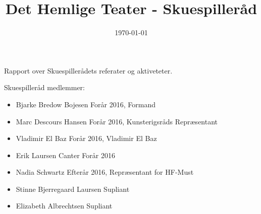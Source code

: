 \documentclass[12pt, a4paper]{article}
\title{Det Hemlige Teater - Skuespilleråd}
\date{\today}
\begin{document}
\listoftodos
\maketitle
\begin{center}
  Rapport over Skuespillerådets referater og aktiveteter.
\end{center}
\vfill
Skuespilleråd medlemmer:
\begin{itemize}
  \item Bjarke Bredow Bojesen \dotfill Forår 2016, Formand
  \item Marc Descours Hansen \dotfill Forår 2016, Kunsterigsråds Repræsentant
  \item Vladimir El Baz \dotfill Forår 2016, Vladimir El Baz
  \item Erik Laursen Canter \dotfill Forår 2016
  \item Nadia Schwartz \dotfill Efterår 2016, Repræsentant for HF-Must
  \item Stinne Bjerregaard Laursen \dotfill Supliant
  \item Elizabeth Albrechtsen \dotfill Supliant
\end{itemize}


\end{document}
